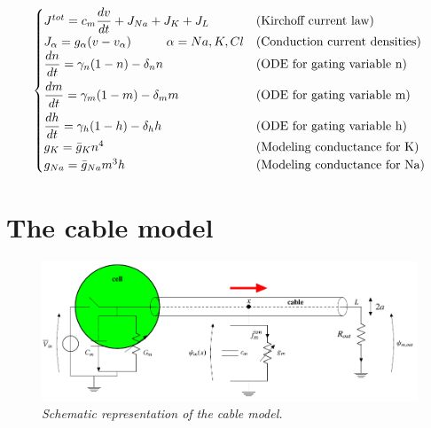 \documentclass[12pt, a4paper]{report}
\begin{document}
\begin{equation} 
\begin{cases}
J^{tot} =  c_m \displaystyle \frac{d v}{d t} + J_{Na} + J_K +J_L  & \text{(Kirchoff current law)}\\
J_\alpha = g_\alpha (v-v_\alpha) \hspace{1 cm}  \alpha = Na,K,Cl & \text{(Conduction current densities)}\\
\displaystyle \frac{dn}{dt} = \gamma_n(1-n) -  \delta_n n & \text{(ODE for gating variable n)} \\[0.7em]
\displaystyle \frac{dm}{dt} =  \gamma_m(1-m) -  \delta_m m & \text{(ODE for gating variable m)}\\[0.7em]
\displaystyle \frac{dh}{dt} =  \gamma_h(1-h) -  \delta_h h & \text{(ODE for gating variable h)}\\ 
g_K = \bar{g}_K n^4 & \text{(Modeling conductance for K)}\\
g_{Na} = \bar{g}_{Na} m^3h  & \text{(Modeling conductance for Na)}

\end{cases}
\end{equation}

	


\section{The cable model} \label{section cable}

\begin{figure}[H]
	\begin{center}
		\hspace*{-0.7cm}
		\includegraphics[scale=0.63]{cable.png} 
	\end{center} 
	\caption{\textit{Schematic representation of the cable model.}}
	\label{cable}
\end{figure}
\end{document}
